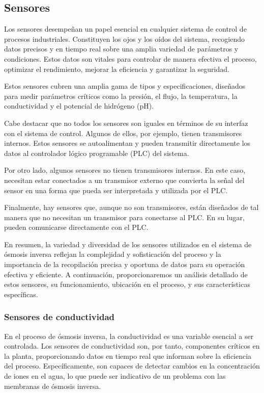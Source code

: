 

\subsection{Sensores}

Los sensores desempeñan un papel esencial en cualquier sistema de control de procesos industriales.
Constituyen los ojos y los oídos del sistema, recogiendo datos precisos y en tiempo real sobre una amplia variedad de
parámetros y condiciones. Estos datos son vitales para controlar de manera efectiva el proceso, optimizar el rendimiento,
mejorar la eficiencia y garantizar la seguridad.

Estos sensores cubren una amplia gama de tipos y especificaciones, diseñados para medir parámetros
críticos como la presión, el flujo, la temperatura, la conductividad y el potencial de hidrógeno (pH).

Cabe destacar que no todos los sensores son iguales en términos de su interfaz con el sistema de control. Algunos de ellos,
por ejemplo, tienen transmisores internos. Estos sensores se autoalimentan y pueden transmitir directamente los datos al
controlador lógico programable (PLC) del sistema.

Por otro lado, algunos sensores no tienen transmisores internos. En este caso, necesitan estar conectados a un transmisor
externo que convierta la señal del sensor en una forma que pueda ser interpretada y utilizada por el PLC.

Finalmente, hay sensores que, aunque no son transmisores, están diseñados de tal manera que no necesitan un transmisor para
conectarse al PLC. En su lugar, pueden comunicarse directamente con el PLC.

En resumen, la variedad y diversidad de los sensores utilizados en el sistema de ósmosis inversa reflejan la complejidad
y sofisticación del proceso y la importancia de la recopilación precisa y oportuna de datos para su operación efectiva
y eficiente. A continuación, proporcionaremos un análisis detallado de estos sensores, su funcionamiento, ubicación
en el proceso, y sus características específicas.

\subsubsection{Sensores de conductividad} \label{sec:sesor_conductividad}

En el proceso de ósmosis inversa, la conductividad es una variable esencial a ser controlada. Los sensores de
conductividad son, por tanto, componentes críticos en la planta, proporcionando datos en tiempo real que informan
sobre la eficiencia del proceso. Específicamente, son capaces de detectar cambios en la concentración de iones
en el agua, lo que puede ser indicativo de un problema con las membranas de ósmosis inversa.

